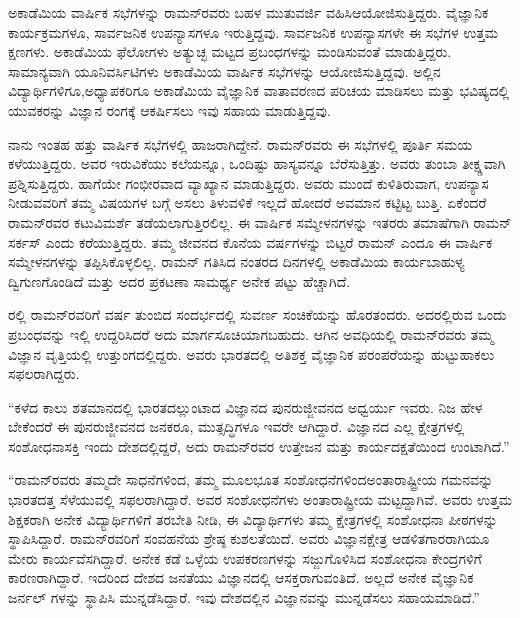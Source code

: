 \vskip 2pt

ಅಕಾಡೆಮಿಯ ವಾರ್ಷಿಕ ಸಭೆಗಳನ್ನು ರಾಮನ್‍ರವರು ಬಹಳ ಮುತುವರ್ಜಿ ವಹಿಸಿ\break ಆಯೋಜಿಸುತ್ತಿದ್ದರು. ವೈಜ್ಞಾನಿಕ ಕಾರ್ಯಕ್ರಮಗಳೂ, ಸಾರ್ವಜನಿಕ ಉಪನ್ಯಾಸಗಳೂ ಇರುತ್ತಿದ್ದವು. ಸಾರ್ವಜನಿಕ ಉಪನ್ಯಾಸಗಳೇ ಈ ಸಭೆಗಳ ಉತ್ತಮ ಕ್ಷಣಗಳು. ಅಕಾಡೆಮಿಯ ಫೆಲೋಗಳು ಅತ್ಯುಚ್ಛ ಮಟ್ಟದ ಪ್ರಬಂಧಗಳನ್ನು ಮಂಡಿಸುವಂತೆ ಮಾಡುತ್ತಿದ್ದರು. ಸಾಮಾನ್ಯವಾಗಿ ಯೂನಿವರ್ಸಿಟಿಗಳು ಅಕಾಡೆಮಿಯ ವಾರ್ಷಿಕ ಸಭೆಗಳನ್ನು ಆಯೋಜಿಸುತ್ತಿದ್ದವು. ಅಲ್ಲಿನ ವಿದ್ಯಾರ್ಥಿಗಳಿಗೂ,\break ಅಧ್ಯಾಪಕರಿಗೂ ಅಕಾಡೆಮಿಯ ವೈಜ್ಞಾನಿಕ ವಾತಾವರಣದ ಪರಿಚಯ ಮಾಡಿಸಲು ಮತ್ತು ಭವಿಷ್ಯದಲ್ಲಿ ಯುವಕರನ್ನು ವಿಜ್ಞಾನ ರಂಗಕ್ಕೆ ಆಕರ್ಷಿಸಲು ಇವು ಸಹಾಯ ಮಾಡುತ್ತಿದ್ದವು.

\vskip 2pt

ನಾನು ಇಂತಹ ಹತ್ತು ವಾರ್ಷಿಕ ಸಭೆಗಳಲ್ಲಿ ಹಾಜರಾಗಿದ್ದೇನೆ. ರಾಮನ್‍ರವರು ಈ ಸಭೆಗಳಲ್ಲಿ ಪೂರ್ತಿ ಸಮಯ ಕಳೆಯುತ್ತಿದ್ದರು. ಅವರ ಇರುವಿಕೆಯು ಕಲೆಯನ್ನೂ, ಒಂದಿಷ್ಟು ಹಾಸ್ಯವನ್ನೂ ಬೆರೆಸುತ್ತಿತ್ತು. ಅವರು ತುಂಬಾ ತೀಕ್ಷ್ಣವಾಗಿ ಪ್ರಶ್ನಿಸುತ್ತಿದ್ದರು. ಹಾಗೆಯೇ ಗಂಭೀರವಾದ ವ್ಯಾಖ್ಯಾನ ಮಾಡುತ್ತಿದ್ದರು. ಅವರು ಮುಂದೆ ಕುಳಿತಿರುವಾಗ, ಉಪನ್ಯಾಸ ನೀಡುವವರಿಗೆ ತಮ್ಮ ವಿಷಯಗಳ ಬಗ್ಗೆ ಅಸಲು ತಿಳುವಳಿಕೆ ಇಲ್ಲದೆ ಹೋದರೆ ಅವಮಾನ ಕಟ್ಟಿಟ್ಟ ಬುತ್ತಿ. ಏಕೆಂದರೆ ರಾಮನ್‍ರವರ ಕಟುವಿಮರ್ಶೆ ತಡೆಯಲಾಗುತ್ತಿರಲಿಲ್ಲ. ಈ ವಾರ್ಷಿಕ ಸಮ್ಮೇಳನಗಳನ್ನು ಇತರರು ತಮಾಷೆಗಾಗಿ ರಾಮನ್ ಸರ್ಕಸ್ ಎಂದು ಕರೆಯುತ್ತಿದ್ದರು. ತಮ್ಮ ಜೀವನದ ಕೊನೆಯ ವರ್ಷಗಳನ್ನು ಬಿಟ್ಟರೆ ರಾಮನ್ ಎಂದೂ ಈ ವಾರ್ಷಿಕ ಸಮ್ಮೇಳನಗಳನ್ನು ತಪ್ಪಿಸಿಕೊಳ್ಳಲಿಲ್ಲ. ರಾಮನ್ ಗತಿಸಿದ ನಂತರದ ದಿನಗಳಲ್ಲಿ ಅಕಾಡೆಮಿಯ ಕಾರ್ಯಬಾಹುಳ್ಯ ದ್ವಿಗುಣಗೊಂಡಿದೆ ಮತ್ತು ಅದರ ಪ್ರಕಟಣಾ ಸಾಮರ್ಥ್ಯ ಅನೇಕ ಪಟ್ಟು ಹೆಚ್ಚಾಗಿದೆ.

\vskip 2pt

ರಲ್ಲಿ ರಾಮನ್‍ರವರಿಗೆ  ವರ್ಷ ತುಂಬಿದ ಸಂದರ್ಭದಲ್ಲಿ ಸುವರ್ಣ ಸಂಚಿಕೆಯನ್ನು ಹೊರತಂದರು. ಅದರಲ್ಲಿರುವ ಒಂದು ಪ್ರಬಂಧವನ್ನು ಇಲ್ಲಿ ಉದ್ದರಿಸಿದರೆ ಅದು ಮಾರ್ಗಸೂಚಿ\-ಯಾಗಬಹುದು. ಆಗಿನ ಅವಧಿಯಲ್ಲಿ ರಾಮನ್‍ರವರು ತಮ್ಮ ವಿಜ್ಞಾನ ವೃತ್ತಿಯಲ್ಲಿ ಉತ್ತುಂಗದಲ್ಲಿದ್ದರು. ಅವರು ಭಾರತದಲ್ಲಿ ಅತಿಶಕ್ತ ವೈಜ್ಞಾನಿಕ ಪರಂಪರೆಯನ್ನು ಹುಟ್ಟುಹಾಕಲು ಸಫಲರಾಗಿದ್ದರು.

\vskip 2pt

“ಕಳೆದ ಕಾಲು ಶತಮಾನದಲ್ಲಿ ಭಾರತದಲ್ಲುಂಟಾದ ವಿಜ್ಞಾನದ ಪುನರುಜ್ಜೀವನದ ಅಧ್ವರ್ಯು ಇವರು. ನಿಜ ಹೇಳ ಬೇಕೆಂದರೆ ಈ ಪುನರುಜ್ಜೀವನದ ಜನಕರೂ, ಮುತ್ಸದ್ಧಿಗಳೂ ಇವರೇ ಆಗಿದ್ದಾರೆ. ವಿಜ್ಞಾನದ ಎಲ್ಲ ಕ್ಷೇತ್ರಗಳಲ್ಲಿ ಸಂಶೋಧನಾಸಕ್ತಿ ಇಂದು ದೇಶದಲ್ಲಿದ್ದರೆ, ಅದು ರಾಮನ್‍ರವರ ಉತ್ತೇಜನ ಮತ್ತು ಕಾರ್ಯದಕ್ಷತೆಯಿಂದ ಉಂಟಾಗಿದೆ.”

\vskip 2pt

“ರಾಮನ್‍ರವರು ತಮ್ಮದೇ ಸಾಧನೆಗಳಿಂದ, ತಮ್ಮ ಮೂಲಭೂತ ಸಂಶೋಧನೆಗಳಿಂದ\break ಅಂತಾರಾಷ್ಟ್ರೀಯ ಗಮನವನ್ನು ಭಾರತದತ್ತ ಸೆಳೆಯುವಲ್ಲಿ ಸಫಲರಾಗಿದ್ದಾರೆ. ಅವರ ಸಂಶೋಧನೆಗಳು ಅಂತಾರಾಷ್ಟ್ರೀಯ ಮಟ್ಟದ್ದಾಗಿವೆ. ಅವರು ಉತ್ತಮ ಶಿಕ್ಷಕರಾಗಿ ಅನೇಕ ವಿದ್ಯಾರ್ಥಿಗಳಿಗೆ ತರಬೇತಿ ನೀಡಿ, ಈ ವಿದ್ಯಾರ್ಥಿಗಳು ತಮ್ಮ ಕ್ಷೇತ್ರಗಳಲ್ಲಿ ಸಂಶೋಧನಾ ಪೀಠಗಳನ್ನು ಸ್ಥಾಪಿಸಿದ್ದಾರೆ. ರಾಮನ್\-‍ರವರಿಗೆ ಸಂವಹನೆಯ ಶ್ರೇಷ್ಠ ಕುಶಲತೆಯಿದೆ. ಅವರು ವಿಜ್ಞಾನಕ್ಷೇತ್ರ ಆಡಳಿತಗಾರರಾಗಿಯೂ ಮೇರು ಕಾರ್ಯವೆಸಗಿದ್ದಾರೆ. ಅನೇಕ ಕಡೆ ಒಳ್ಳೆಯ ಉಪಕರಣಗಳನ್ನು ಸಜ್ಜುಗೊಳಿಸಿದ ಸಂಶೋಧನಾ ಕೇಂದ್ರಗಳಿಗೆ ಕಾರಣರಾಗಿದ್ದಾರೆ. ಇದರಿಂದ ದೇಶದ ಜನತೆಯು ವಿಜ್ಞಾನದಲ್ಲಿ ಆಸಕ್ತರಾಗುವಂತಿದೆ. ಅಲ್ಲದೆ ಅನೇಕ ವೈಜ್ಞಾನಿಕ ಜರ್ನಲ್ ಗಳನ್ನು ಸ್ಥಾಪಿಸಿ ಮುನ್ನಡೆಸಿದ್ದಾರೆ. ಇವು ದೇಶದಲ್ಲಿನ ವಿಜ್ಞಾನವನ್ನು ಮುನ್ನಡೆಸಲು ಸಹಾಯಮಾಡಿದೆ.”


